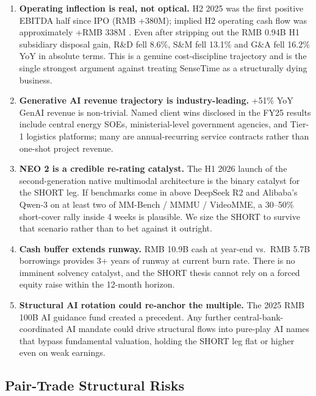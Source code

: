 \documentclass[11pt,a4paper]{article}
\begin{document}
\begin{enumerate}
\item \textbf{Operating inflection is real, not optical.} H2 2025 was the first positive EBITDA half since IPO (RMB +380M); implied H2 operating cash flow was approximately +RMB 338M \cite{krasia2026sensetime}. Even after stripping out the RMB 0.94B H1 subsidiary disposal gain, R\&D fell 8.6\%, S\&M fell 13.1\% and G\&A fell 16.2\% YoY in absolute terms. This is a genuine cost-discipline trajectory and is the single strongest argument against treating SenseTime as a structurally dying business.
\item \textbf{Generative AI revenue trajectory is industry-leading.} +51\% YoY GenAI revenue is non-trivial. Named client wins disclosed in the FY25 results include central energy SOEs, ministerial-level government agencies, and Tier-1 logistics platforms; many are annual-recurring service contracts rather than one-shot project revenue.
\item \textbf{NEO 2 is a credible re-rating catalyst.} The H1 2026 launch of the second-generation native multimodal architecture is the binary catalyst for the SHORT leg. If benchmarks come in above DeepSeek R2 and Alibaba's Qwen-3 on at least two of MM-Bench / MMMU / VideoMME, a 30--50\% short-cover rally inside 4 weeks is plausible. We size the SHORT to survive that scenario rather than to bet against it outright.
\item \textbf{Cash buffer extends runway.} RMB 10.9B cash at year-end vs.\ RMB 5.7B borrowings provides 3+ years of runway at current burn rate. There is no imminent solvency catalyst, and the SHORT thesis cannot rely on a forced equity raise within the 12-month horizon.
\item \textbf{Structural AI rotation could re-anchor the multiple.} The 2025 RMB 100B AI guidance fund created a precedent. Any further central-bank-coordinated AI mandate could drive structural flows into pure-play AI names that bypass fundamental valuation, holding the SHORT leg flat or higher even on weak earnings.
\end{enumerate}

\subsection{Pair-Trade Structural Risks}
\end{document}
